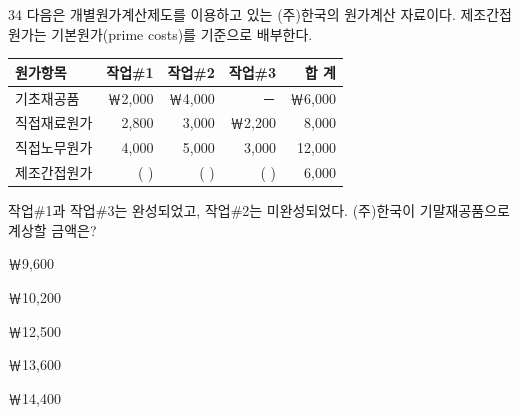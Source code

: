 \begin{question}{34}
다음은 개별원가계산제도를 이용하고 있는 (주)한국의 원가계산 자료이다. 제조간접원가는 기본원가(prime costs)를 기준으로 배부한다.
\begin{center}
\small
\begin{tabular}{|l|r|r|r|r|}
\hline
원가항목 & 작업\#1 & 작업\#2 & 작업\#3 & 합 계 \\
\hline
기초재공품 & ￦2,000 & ￦4,000 & － & ￦6,000 \\
직접재료원가 & 2,800 & 3,000 & ￦2,200 & 8,000 \\
직접노무원가 & 4,000 & 5,000 & 3,000 & 12,000 \\
제조간접원가 & ( \hspace{1em} ) & ( \hspace{1em} ) & ( \hspace{1em} ) & 6,000 \\
\hline
\end{tabular}
\end{center}
작업\#1과 작업\#3는 완성되었고, 작업\#2는 미완성되었다. (주)한국이 기말재공품으로 계상할 금액은? \par
\begin{choices}
  \item ￦9,600
  \item ￦10,200
  \item ￦12,500
  \item ￦13,600
  \item ￦14,400
\end{choices}
\end{question}
